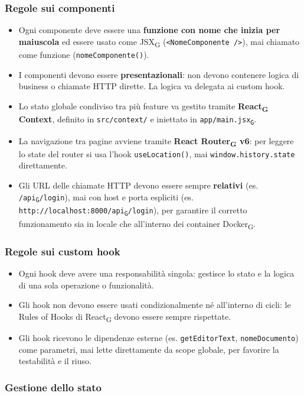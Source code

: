 \documentclass[11pt,a4paper]{article}
\newcommand{\gls}[1]{#1\textsubscript{G}}
\begin{document}
\subsubsection{Regole sui componenti}
\begin{itemize}
    \item Ogni componente deve essere una \textbf{funzione con nome che inizia per maiuscola} ed essere usato come \gls{JSX} (\texttt{<NomeComponente />}), mai chiamato come funzione (\texttt{nomeComponente()}).
    \item I componenti devono essere \textbf{presentazionali}: non devono contenere logica di business o chiamate HTTP dirette. La logica va delegata ai custom hook.
    \item Lo stato globale condiviso tra più feature va gestito tramite \textbf{\gls{React} Context}, definito in \texttt{src/context/} e iniettato in \texttt{app/main.\gls{jsx}}.
    \item La navigazione tra pagine avviene tramite \textbf{\gls{React Router} v6}: per leggere lo state del router si usa l'hook \texttt{useLocation()}, mai \texttt{window.history.state} direttamente.
    \item Gli URL delle chiamate HTTP devono essere sempre \textbf{relativi} (es. \texttt{/\gls{api}/login}), mai con host e porta espliciti (es. \texttt{http://localhost:8000/\gls{api}/login}), per garantire il corretto funzionamento sia in locale che all'interno dei container \gls{Docker}.
\end{itemize}
 
\subsubsection{Regole sui custom hook}
 
\begin{itemize}
    \item Ogni hook deve avere una responsabilità singola: gestisce lo stato e la logica di una sola operazione o funzionalità.
    \item Gli hook non devono essere usati condizionalmente né all'interno di cicli: le Rules of Hooks di \gls{React} devono essere sempre rispettate.
    \item Gli hook ricevono le dipendenze esterne (es. \texttt{getEditorText}, \texttt{nomeDocumento}) come parametri, mai lette direttamente da scope globale, per favorire la testabilità e il riuso.
\end{itemize}
 
\subsubsection{Gestione dello stato}
 
\end{document}
